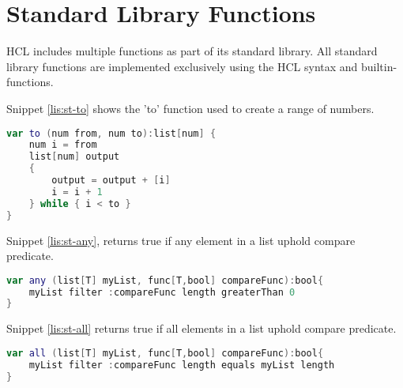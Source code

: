 \section{Standard Library Functions}
\label{standardLib}
HCL includes multiple functions as part of its standard library.
All standard library functions are implemented exclusively using the HCL syntax and builtin-functions. 

Snippet \ref{lis:st-to} shows the 'to' function used to create a range of numbers.
\begin{lstlisting}[language=Kotlin,label=lis:st-to,caption=\texttt{to} function.]
var to (num from, num to):list[num] {
	num i = from
	list[num] output
	{
		output = output + [i]
		i = i + 1
	} while { i < to }
}
\end{lstlisting}

Snippet \ref{lis:st-any}, returns true if any element in a list uphold compare predicate.
\begin{lstlisting}[language=Kotlin,label=lis:st-any,caption=\texttt{any} function.]
var any (list[T] myList, func[T,bool] compareFunc):bool{
	myList filter :compareFunc length greaterThan 0
}
\end{lstlisting}

Snippet \ref{lis:st-all} returns true if all elements in a list uphold compare predicate.
\begin{lstlisting}[language=Kotlin,label=lis:st-all,caption=\texttt{all} function.]
var all (list[T] myList, func[T,bool] compareFunc):bool{
	myList filter :compareFunc length equals myList length
}
\end{lstlisting}